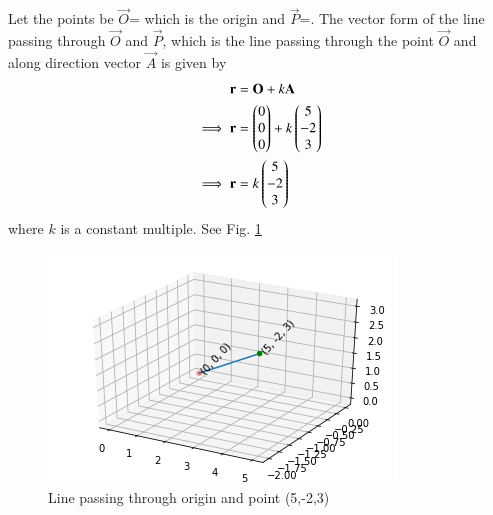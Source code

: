 Let the points be $\vec{O}$= which is the origin and $\vec{P}$=.
The vector form of the line passing through $\vec{O}$ and $\vec{P}$, which is the line passing through the point $\vec{O}$ and along direction vector $\vec{A}$ is given by
\begin{align}
\mathbf{r} &= \mathbf{O}+k\mathbf{A}\\
\implies\mathbf{r} &= \begin{pmatrix}0 \\ 0 \\ 0\end{pmatrix}+k\begin{pmatrix}5 \\ -2 \\ 3\end{pmatrix}\\
\implies\mathbf{r} &= k\begin{pmatrix}5 \\ -2 \\ 3\end{pmatrix}
\end{align}
where $k$ is a constant multiple.  See Fig.     \ref{fig:sol_line_plane_71}

\begin{figure}[h!]
    \centering
    \includegraphics[width = \columnwidth]{./solutions/line_plane/71/Line_Image.png}
    \caption{Line passing through origin and point (5,-2,3)}
    \label{fig:sol_line_plane_71}
\end{figure}
